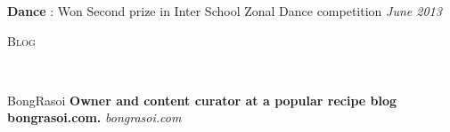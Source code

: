 \documentclass[9pt]{article}
\newenvironment{changemargin}[2]{%
  \begin{list}{}{%
    \setlength{\topsep}{0pt}%
    \setlength{\leftmargin}{#1}%
    \setlength{\rightmargin}{#2}%
    \setlength{\listparindent}{\parindent}%
    \setlength{\itemindent}{\parindent}%
    \setlength{\parsep}{\parskip}%
  }%
  \item[]}{\end{list}
}
\newcommand{\lineover}{
	\begin{changemargin}{-0.05in}{-0.05in}
		\vspace*{-8pt}
		\hrulefill \\
		\vspace*{-2pt}
	\end{changemargin}
}
\newcommand{\header}[1]{
	\begin{changemargin}{-0.5in}{-0.5in}
		\scshape{#1}\\
  	\lineover
	\end{changemargin}
}
\newenvironment{body} {
	\vspace*{-16pt}
	\begin{changemargin}{-0.25in}{-0.5in}
  }
	{\end{changemargin}
}
\begin{document}
\begin{body}
	\vspace{14pt}
	\textbf{Dance} : Won Second prize in Inter School Zonal Dance competition \hfill {} \emph{June 2013}\\
	\smallskip
\end{body}

\smallskip

\header{Blog}

\begin{body}
	\vspace{14pt}
	BongRasoi \textbf{Owner and content curator at a popular recipe blog bongrasoi.com.} \emph{bongrasoi.com}\\
	\smallskip
\end{body}

\smallskip
\end{document}
